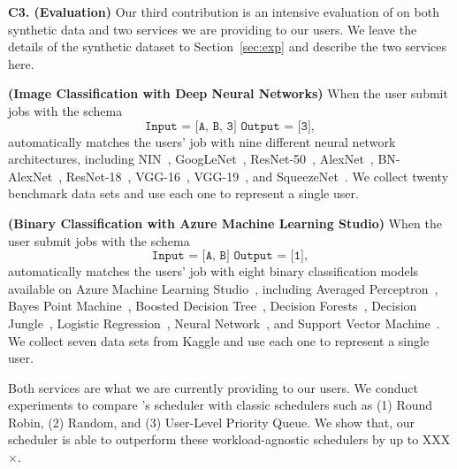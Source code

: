 \vspace{0.5em} \noindent
{\bf C3. (Evaluation)} Our third contribution is an intensive
evaluation of \eml on both synthetic data and two 
services we are providing to our users. We leave the 
details of the synthetic dataset to Section~\ref{sec:exp}
and describe the two services here.

{\bf (Image Classification with Deep Neural Networks)} When
the user submit jobs with the schema
\[
\texttt{Input = [A, B, 3]
        Output = [3]},
\]
\eml automatically matches the users' job with nine
different neural network architectures, including
NIN~\cite{XXX}, GoogLeNet~\cite{XXX}, ResNet-50~\cite{XXX}, AlexNet~\cite{XXX},
BN-AlexNet~\cite{XXX}, ResNet-18~\cite{XXX}, VGG-16~\cite{XXX}, VGG-19~\cite{XXX},
and SqueezeNet~\cite{XXX}. We collect twenty 
benchmark data sets and use each one to represent a single user.

{\bf (Binary Classification with Azure Machine Learning Studio)}
When the user submit jobs with the schema
\[
\texttt{Input = [A, B]
        Output = [1]},
\]
\eml automatically matches the users' job with eight
binary classification models available on 
Azure Machine Learning Studio~\cite{XXX},
including Averaged Perceptron~\cite{XXX}, Bayes Point Machine~\cite{XXX},
Boosted Decision Tree~\cite{XXX}, Decision Forests~\cite{XXX}, 
Decision Jungle~\cite{XXX}, Logistic Regression~\cite{XXX}, Neural Network~\cite{XXX},
and Support Vector Machine~\cite{XXX}. We collect seven
data sets from Kaggle and use each one to represent a single user.

Both services are what we are currently providing
to our users. We conduct experiments to compare
\eml's scheduler with classic schedulers such as
(1) Round Robin, (2) Random, and 
(3) User-Level Priority Queue. We show that,
our scheduler is able to outperform
these workload-agnostic schedulers
by up to XXX$\times$.

